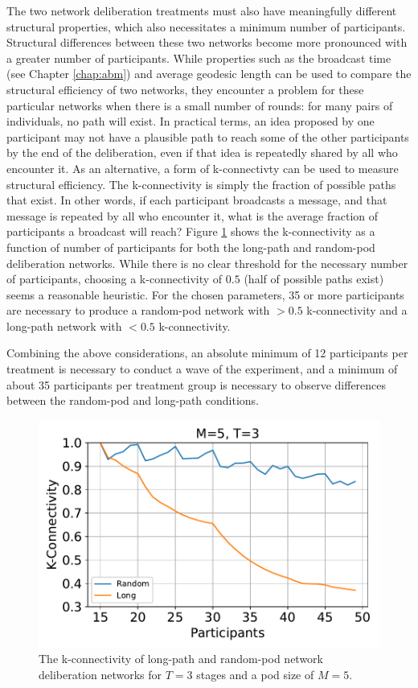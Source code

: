 The two network deliberation treatments must also have meaningfully different
structural properties,
which also necessitates a minimum number of participants.
Structural differences between these two networks become more pronounced
with a greater number of participants.
While properties such as the broadcast time (see Chapter \ref{chap:abm})
and average geodesic length can be used to compare the structural efficiency of
two networks,
they encounter a problem for these particular networks
when there is a small number of rounds:
for many pairs of individuals, no path will exist.
In practical terms,
an idea proposed by one participant may not have a plausible
path to reach some of the other participants by the end of the deliberation,
even if that idea is repeatedly shared by all who encounter it.
As an alternative, a form of k-connectivty can be used to measure
structural efficiency.
The k-connectivity is simply the fraction of possible paths that exist.
In other words, if each participant broadcasts a message, and that message is
repeated by all who encounter it, what is the average fraction of participants
a broadcast will reach?
Figure \ref{fig:kcon} shows the k-connectivity as a function of number of
participants for both the long-path and random-pod deliberation networks.
While there is no clear threshold for the necessary number of participants,
choosing a k-connectivity of $0.5$ (half of possible paths exist) seems a
reasonable heuristic.
For the chosen parameters, 35 or more participants are necessary to produce
a random-pod network with $>0.5$ k-connectivity and
a long-path network with $<0.5$ k-connectivity.

Combining the above considerations,
an absolute minimum of 12 participants per treatment is necessary to conduct
a wave of the experiment,
and a minimum of about 35 participants per treatment group is necessary to
observe differences between the random-pod and long-path conditions.

\begin{figure}
\center
\includegraphics[width=5in]{chapters/figures/NetDelibExp/fig-kcon}
\caption{The k-connectivity of long-path and random-pod network deliberation
networks for $T=3$ stages and a pod size of $M=5$.}
\label{fig:kcon}
\end{figure}


